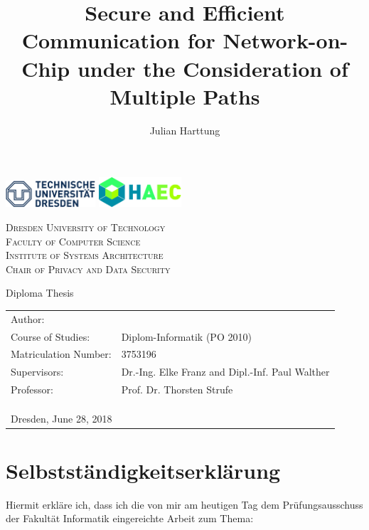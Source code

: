 \documentclass[
	paper=a4,
	fontsize=11pt,
	parskip=full %
]{scrreprt}
\author{Julian Harttung}
\title{Secure and Efficient Communication for Network-on-Chip under the Consideration of Multiple Paths}
\newcommand{\thesubtitle}{Diploma Thesis}
\newcommand{\theuniversity}{Dresden University of Technology}
\newcommand{\thefaculty}{Faculty of Computer Science}
\newcommand{\theinstitute}{Institute of Systems Architecture}
\newcommand{\thechair}{Chair of Privacy and Data Security}
\begin{document}
    \frenchspacing %
	\begin{titlepage}
		\includegraphics[width=0.25\textwidth]{TU_Dresden_Logo_blau_HKS41}
		\hfill
		\includegraphics[width=0.23\textwidth]{HAEC_Logo_cmyk}
		\vspace{1.5\baselineskip}
		
		\begin{center}
			\textsc{\theuniversity \\
					\thefaculty \\
					\theinstitute \\
					\thechair}
			\vspace{2.5\baselineskip}
		
			\Huge{\thetitle}
			\vspace{.5\baselineskip}
			
			\LARGE{\thesubtitle}
		\end{center}
		
		\vfill
		
		\begin{tabular}{ll}
			Author:               & \theauthor \\
			Course of Studies:    & Diplom-Informatik (PO 2010)\\
			Matriculation Number: & 3753196 \\
			Supervisors:          & Dr.-Ing. Elke Franz and Dipl.-Inf. Paul Walther \\
			Professor:            & Prof. Dr. Thorsten Strufe \\
			\multicolumn{2}{l}{ } \\
			\multicolumn{2}{l}{ } \\
			\multicolumn{2}{l}{ } \\
			\multicolumn{2}{l}{Dresden, June 28, 2018}
		\end{tabular}
	\end{titlepage}
	
	
	
	
    \chapter*{Selbstständigkeitserklärung}
    Hiermit erkläre ich, dass ich die von mir am heutigen Tag dem Prüfungsausschuss der Fakultät Informatik eingereichte Arbeit zum Thema:
    \begin{adjustwidth}{0.15\textwidth}{0.15\textwidth}
        \begin{center}
            \textit{\thetitle}
        \end{center}
    \end{adjustwidth}
\end{document}
